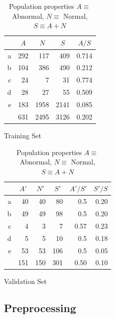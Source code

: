 \documentclass[11pt,letterpaper]{article}
\begin{document}
\begin{table}[ht]
    \centering
    \begin{subtable}{0.48\textwidth}
        \centering
        \begin{tabular}{*{5}{r}}
            {}  & \multicolumn{1}{c}{$A$} & \multicolumn{1}{c}{$N$} & \multicolumn{1}{c}{$S$} & \multicolumn{1}{c}{$A/S$} \\
            \midrule
            a & 292 & 117   & 409   & 0.714 \\
            b & 104 & 386   & 490   & 0.212 \\
            c & 24  & 7     & 31    & 0.774 \\
            d & 28  & 27    & 55    & 0.509 \\
            e & 183 & 1958  & 2141  & 0.085 \\
            \midrule
            & 631 & 2495 & 3126 & 0.202 \\
        \end{tabular}
        \caption{Training Set}
    \end{subtable}
    \begin{subtable}{0.48\textwidth}
        \centering
        \begin{tabular}{*{6}{r}}
            {}  & \multicolumn{1}{c}{$A'$} & \multicolumn{1}{c}{$N'$} & \multicolumn{1}{c}{$S'$} & \multicolumn{1}{c}{$A'/S'$} & $S'/S$ \\
            \midrule
            a & 40  & 40    & 80    & 0.5   & 0.20 \\
            b & 49  & 49    & 98    & 0.5   & 0.20 \\
            c & 4   & 3     & 7     & 0.57  & 0.23 \\
            d & 5   & 5     & 10    & 0.5   & 0.18 \\
            e & 53  & 53    & 106   & 0.5   & 0.05 \\
            \midrule
            & 151 & 150 & 301 & 0.50 & 0.10 \\
        \end{tabular}
        \caption{Validation Set}
    \end{subtable}
    
    \caption{Population properties $A \equiv$ Abnormal, $N\equiv$ Normal, $S\equiv A+N$}
    \label{tab:populations}
\end{table}

\subsection{Preprocessing} %
\label{sub:preprocessing}
\end{document}
